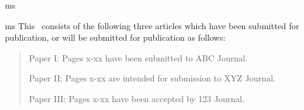\documentclass[times,12pt,titlepage]{mstogs}
\begin{document}

\begin{ThesisTitlePage}{ms}

\author{\MakeUppercase{Full Legal Name}}







\end{ThesisTitlePage}




\begin{ThesisPublicationOption}{ms}
  This \ThesisDissertationType\ consists of the following three
  articles which have been submitted for publication, or will be
  submitted for publication as follows:
\begin{quote}\begin{description}
\item Paper I: Pages x-xx have been submitted to ABC Journal.
\item Paper II: Pages x-xx are intended for submission to XYZ Journal.
\item Paper III: Pages x-xx have been accepted by 123 Journal.
\end{description}\end{quote}

\end{ThesisPublicationOption}


\begin{ThesisAbstract}
\lipsum[1]
\end{ThesisAbstract}


\begin{ThesisAcknowledgment}
\lipsum[2-3]
\end{ThesisAcknowledgment}
\end{document}
